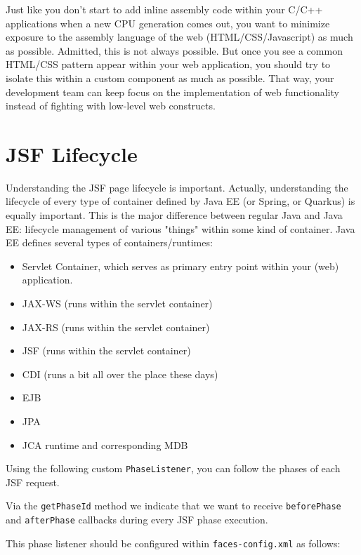 Just like you don't start to add inline assembly code within your C/C++ applications when a new CPU generation comes out,
you want to minimize exposure to the assembly language of the web (HTML/CSS/Javascript) as much as possible.
Admitted, this is not always possible.
But once you see a common HTML/CSS pattern appear within your web application,
you should try to isolate this within a custom component as much as possible.
That way, your development team can keep focus on the implementation of web functionality instead of fighting with low-level web constructs.

\section{JSF Lifecycle}
Understanding the JSF page lifecycle is important.
Actually, understanding the lifecycle of every type of container defined by Java EE (or Spring, or Quarkus) is equally important.
This is the major difference between regular Java and Java EE: lifecycle management of various "things" within some kind of container.
Java EE defines several types of containers/runtimes:
\begin{itemize}
	\item Servlet Container, which serves as primary entry point within your (web) application.
	\item JAX-WS (runs within the servlet container)
	\item JAX-RS (runs within the servlet container)
	\item JSF (runs within the servlet container)
	\item CDI (runs a bit all over the place these days)
	\item EJB
	\item JPA
	\item JCA runtime and corresponding MDB
\end{itemize}

Using the following custom \texttt{PhaseListener}, you can follow the phases of each JSF request.

Via the \texttt{getPhaseId} method we indicate that we want to receive \texttt{beforePhase} and \texttt{afterPhase} callbacks during every JSF phase execution.

This phase listener should be configured within \texttt{faces-config.xml} as follows:


